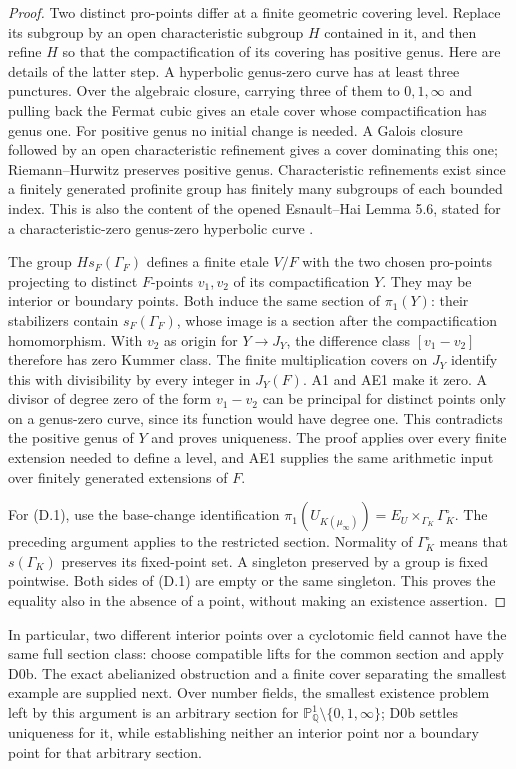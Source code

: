 \begin{proof}
Two distinct pro-points differ at a finite geometric covering level. Replace its subgroup by an open characteristic subgroup $H$ contained in it, and then refine $H$ so that the compactification of its covering has positive genus. Here are details of the latter step. A hyperbolic genus-zero curve has at least three punctures. Over the algebraic closure, carrying three of them to $0,1,\infty$ and pulling back the Fermat cubic gives an etale cover whose compactification has genus one. For positive genus no initial change is needed. A Galois closure followed by an open characteristic refinement gives a cover dominating this one; Riemann--Hurwitz preserves positive genus. Characteristic refinements exist since a finitely generated profinite group has finitely many subgroups of each bounded index. This is also the content of the opened Esnault--Hai Lemma 5.6, stated for a characteristic-zero genus-zero hyperbolic curve \cite{EsnaultHai2008}.

The group $H s_F(\Gamma_F)$ defines a finite etale $V/F$ with the two chosen pro-points projecting to distinct $F$-points $v_1,v_2$ of its compactification $Y$. They may be interior or boundary points. Both induce the same section of $\pi_1(Y)$: their stabilizers contain $s_F(\Gamma_F)$, whose image is a section after the compactification homomorphism. With $v_2$ as origin for $Y\to J_Y$, the difference class $[v_1-v_2]$ therefore has zero Kummer class. The finite multiplication covers on $J_Y$ identify this with divisibility by every integer in $J_Y(F)$. A1 and AE1 make it zero. A divisor of degree zero of the form $v_1-v_2$ can be principal for distinct points only on a genus-zero curve, since its function would have degree one. This contradicts the positive genus of $Y$ and proves uniqueness. The proof applies over every finite extension needed to define a level, and AE1 supplies the same arithmetic input over finitely generated extensions of $F$.

For (D.1), use the base-change identification $\pi_1(U_{K(\mu_\infty)})=E_U\times_{\Gamma_K}\Gamma_K^\circ$. The preceding argument applies to the restricted section. Normality of $\Gamma_K^\circ$ means that $s(\Gamma_K)$ preserves its fixed-point set. A singleton preserved by a group is fixed pointwise. Both sides of (D.1) are empty or the same singleton. This proves the equality also in the absence of a point, without making an existence assertion.
\end{proof}

In particular, two different interior points over a cyclotomic field cannot have the same full section class: choose compatible lifts for the common section and apply D0b. The exact abelianized obstruction and a finite cover separating the smallest example are supplied next. Over number fields, the smallest existence problem left by this argument is an arbitrary section for $\mathbb P^1_{\mathbb Q}\setminus\{0,1,\infty\}$; D0b settles uniqueness for it, while establishing neither an interior point nor a boundary point for that arbitrary section.
